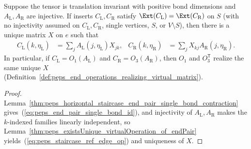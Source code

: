 \begin{lemma}
    \label{thm:peps_existsUnique_virtualOperation_of_horizontal_staircase_end_pair}
    \leanok
    Suppose the tensor is translation invariant with positive bond dimensions
    and $A_{\mathrm L},A_{\mathrm R}$ are injective. If inserts $C_{\mathrm L},C_{\mathrm R}$
    satisfy $\Ext(C_{\mathrm L})=\Ext(C_{\mathrm R})$ on $S$ (with no
    injectivity assumed on $C_{\mathrm L},C_{\mathrm R}$, single vertices, $S$,
    or $V\setminus S$), then there is a unique matrix $X$ on $e$ such that
    \begin{align}
        C_{\mathrm L}(k,\eta_{\mathrm L})
         & =\sum_j A_{\mathrm L}(j,\eta_{\mathrm L})X_{jk},
         &
        C_{\mathrm R}(k,\eta_{\mathrm R})
         & =\sum_j X_{kj}A_{\mathrm R}(j,\eta_{\mathrm R}).
        \label{eq:peps_staircase_ref_edge_op}
    \end{align}
    In particular, if $C_{\mathrm L}=O_1(A_{\mathrm L})$ and
    $C_{\mathrm R}=O_3(A_{\mathrm R})$, then $O_1$ and $O_3^{\mathsf T}$ realize
    the same unique $X$ (Definition~\ref{def:peps_end_operations_realizing_virtual_matrix}).
\end{lemma}
\begin{proof}\leanok
    Lemma~\ref{thm:peps_horizontal_staircase_end_pair_single_bond_contraction}
    gives~(\ref{eq:peps_end_pair_single_bond_id}), and injectivity of
    $A_{\mathrm L},A_{\mathrm R}$ makes the $k$-indexed families linearly
    independent, so Lemma~\ref{thm:peps_existsUnique_virtualOperation_of_endPair}
    yields~(\ref{eq:peps_staircase_ref_edge_op}) and uniqueness of $X$.
\end{proof}

